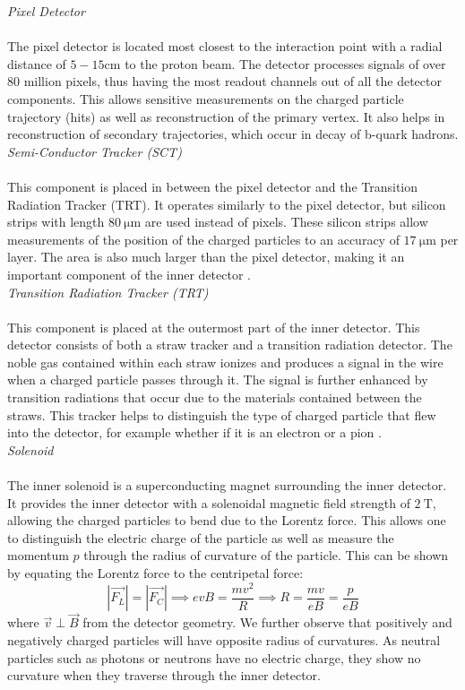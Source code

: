 \documentclass[a4paper]{report}
\numberwithin{equation}{section}
\begin{document}
\noindent \textit{Pixel Detector} \\ \\
The pixel detector is located most closest to the interaction point with a radial distance of $5 - 15$cm to the proton beam. The detector processes signals of 
over 80 million pixels, thus having the most readout channels out of all the detector components. This allows sensitive measurements on the charged particle 
trajectory (hits) as well as reconstruction of the primary vertex. It also helps in reconstruction of secondary trajectories, which occur in decay of b-quark 
hadrons. \\ 

\noindent \textit{Semi-Conductor Tracker (SCT)} \\ \\ 
This component is placed in between the pixel detector and the Transition Radiation Tracker (TRT). It operates similarly to the pixel detector, but 
silicon strips with length $\SI{80}{\micro\metre}$ are used instead of pixels. These silicon strips allow measurements of the position of the 
charged particles to an accuracy of $\SI{17}{\micro\metre}$ per layer. The area is also much larger than the pixel detector, making it an important component 
of the inner detector \cite{ATLASFactSheet}. \\ 

\noindent \textit{Transition Radiation Tracker (TRT)} \\ \\ 
This component is placed at the outermost part of the inner detector. This detector consists of both a straw tracker and a transition radiation detector. 
The noble gas contained within each straw ionizes and produces a signal in the wire when a charged particle passes through it. The signal is further enhanced 
by transition radiations that occur due to the materials contained between the straws. This tracker helps to distinguish the type of charged particle that
flew into the detector, for example whether if it is an electron or a pion \cite{ATLASFactSheet}. \\ 

\noindent \textit{Solenoid} \\ \\ 
The inner solenoid is a superconducting magnet surrounding the inner detector. It provides the inner detector with a solenoidal magnetic field strength of 
$\SI{2}{\tesla}$, allowing the charged particles to bend due to the Lorentz force. This allows one to distinguish the electric charge of the particle 
as well as measure the momentum $p$ through the radius of curvature of the particle. This can be shown by equating the Lorentz force to the 
centripetal force:
\begin{equation}
	|\vec{F_L}| = |\vec{F_C}| \implies evB = \frac{mv^2}{R} \implies R = \frac{mv}{eB} = \frac{p}{eB}
	\label{eq:rad_curvature}
\end{equation}
where $\vec{v} \perp \vec{B}$ from the detector geometry. We further observe that positively and negatively charged particles will have 
opposite radius of curvatures. As neutral particles such as photons or neutrons 
have no electric charge, they show no curvature when they traverse through the inner detector. 
\end{document}
